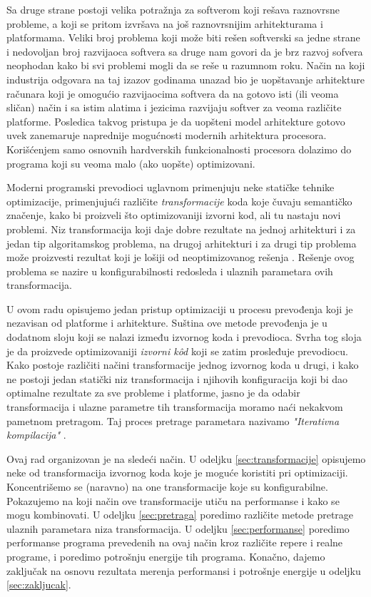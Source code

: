 \documentclass[a4paper]{article}
\begin{document}
\par
Sa druge strane postoji velika potražnja za softverom koji rešava raznovrsne probleme, a koji se pritom izvršava na još raznovrsnijim arhitekturama i platformama.
Veliki broj problema koji može biti rešen softverski sa jedne strane i nedovoljan broj razvijaoca softvera sa druge nam govori da je brz razvoj sofvera neophodan kako bi svi problemi 
mogli da se reše u razumnom roku. Način na koji industrija odgovara na taj izazov godinama unazad bio je uopštavanje arhitekture računara koji je omogućio razvijaocima softvera 
da na gotovo isti (ili veoma sličan) način i sa istim alatima i jezicima razvijaju softver za veoma različite platforme. Posledica takvog pristupa je da uopšteni model arhitekture gotovo uvek zanemaruje 
naprednije mogućnosti modernih arhitektura procesora. Korišćenjem samo osnovnih hardverskih funkcionalnosti procesora dolazimo do programa koji su veoma malo (ako uopšte) optimizovani.

\par 
Moderni programski prevodioci uglavnom primenjuju neke statičke tehnike optimizacije, primenjujući različite 
\emph{transformacije} koda koje čuvaju semantičko značenje, kako bi proizveli što optimizovaniji izvorni kod, ali tu nastaju novi problemi. 
Niz transformacija koji daje dobre rezultate na jednoj arhitekturi i za jedan tip algoritamskog problema, 
na drugoj arhitekturi i za drugi tip problema može proizvesti rezultat koji je lošiji od neoptimizovanog rešenja \cite{gheorghita2005iterative}.
Rešenje ovog problema se nazire u konfigurabilnosti redosleda i ulaznih parametara ovih transformacija.
\par
U ovom radu opisujemo jedan pristup optimizaciji u procesu prevođenja koji je nezavisan od platforme i arhitekture. 
Suština ove metode prevođenja je u dodatnom sloju koji se nalazi između izvornog koda i prevodioca. 
Svrha tog sloja je da proizvede optimizovaniji \emph{izvorni k\^{o}d} koji se zatim prosleđuje 
prevodiocu. Kako postoje različiti načini transformacije jednog izvornog koda u drugi, i kako ne postoji jedan statički niz transformacija i njihovih konfiguracija koji bi dao optimalne rezultate za sve probleme i platforme, 
jasno je da odabir transformacija i ulazne parametre tih transformacija moramo naći nekakvom pametnom pretragom. 
Taj proces pretrage parametara nazivamo \emph{"Iterativna kompilacija"} \cite{kisuki2000iterative}.
\par
Ovaj rad organizovan je na sledeći način. 
U odeljku \ref{sec:transformacije} opisujemo neke od transformacija izvornog koda koje je moguće koristiti pri optimizaciji. 
Koncentrišemo se (naravno) na one transformacije koje su konfigurabilne. Pokazujemo na koji način ove transformacije utiču na performanse i kako se mogu kombinovati. 
U odeljku \ref{sec:pretraga} poredimo različite metode pretrage ulaznih parametara niza transformacija.
U odeljku \ref{sec:performanse} poredimo performanse programa prevedenih na ovaj način kroz različite repere i realne programe, i poredimo potrošnju energije tih programa.
Konačno, dajemo zaključak na osnovu rezultata merenja performansi i potrošnje energije u odeljku \ref{sec:zakljucak}.
\end{document}
